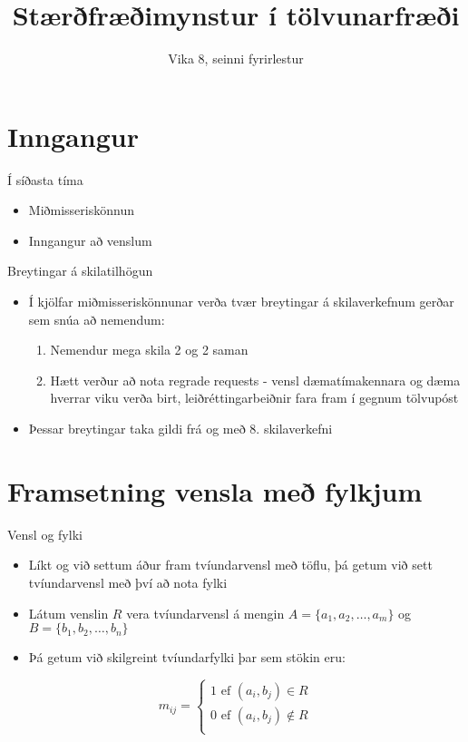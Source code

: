 \documentclass[handout]{beamer}
\title{Stærðfræðimynstur í tölvunarfræði}
\subtitle{Vika 8, seinni fyrirlestur}
\begin{document}
\begin{frame}
\titlepage
\end{frame}


\section{Inngangur}

\begin{frame}{Í síðasta tíma}
    \begin{itemize}
        \item Miðmisseriskönnun
        \item Inngangur að venslum
    \end{itemize}
\end{frame}

\begin{frame}{Breytingar á skilatilhögun}
    \begin{itemize}
        \item Í kjölfar miðmisseriskönnunar verða tvær breytingar á skilaverkefnum gerðar sem snúa að nemendum:
        \begin{enumerate}
            \item Nemendur mega skila 2 og 2 saman
            \item Hætt verður að nota regrade requests - vensl dæmatímakennara og dæma hverrar viku verða birt, leiðréttingarbeiðnir fara fram í gegnum tölvupóst
        \end{enumerate}
        \item Þessar breytingar taka gildi frá og með 8. skilaverkefni
    \end{itemize}
\end{frame}

\section{Framsetning vensla með fylkjum}

\begin{frame}{Vensl og fylki}
\begin{itemize}
 \item Líkt og við settum áður fram tvíundarvensl með töflu, þá getum við sett tvíundarvensl með því að nota fylki
 \item Látum venslin $R$ vera tvíundarvensl á mengin $A = \{a_1, a_2, \ldots, a_m \}$ og $B = \{b_1, b_2, \ldots, b_n\}$
 \item Þá getum við skilgreint tvíundarfylki þar sem stökin eru:
\end{itemize}
\[
 m_{ij} = \left\{
\begin{matrix}
1 \text{ ef } (a_i, b_j) \in R\\
0 \text{ ef } (a_i, b_j) \notin R\\
\end{matrix}\right.
\]
\end{frame}
\end{document}
